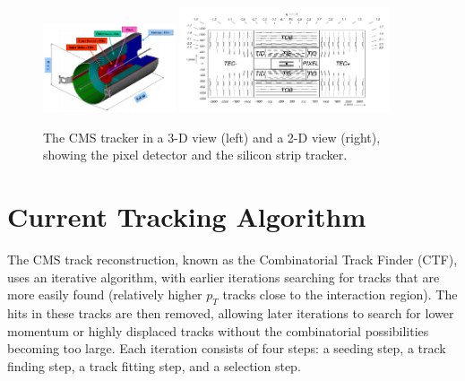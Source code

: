 \documentclass{JINST}
\begin{document}
\begin{figure}[!Hhtb]
\begin{center}
	\includegraphics[width=0.35\textwidth]{figs/CMSTrackerLayout.pdf}
	\includegraphics[width=0.55\textwidth]{figs/CMS2DLayout.pdf}
	\caption{The CMS tracker in a 3-D view (left) and a 2-D view (right), showing the pixel detector and the silicon
	strip tracker. \label{fig:tracker}}
	\end{center}
\end{figure}


\section{Current Tracking Algorithm}

The CMS track reconstruction, known as the Combinatorial Track Finder (CTF), uses an iterative algorithm,
with earlier iterations searching for tracks that are more easily found (relatively higher $p_T$ tracks
close to the interaction region). The hits in these tracks are then removed, allowing later iterations to
search for lower momentum or highly displaced tracks without the combinatorial possibilities becoming too
large. Each iteration consists of four steps: a seeding step, a track finding step, a track fitting step,
and a selection step.
\end{document}
